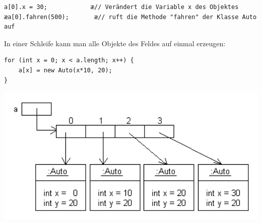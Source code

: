 \begin{lstlisting}
a[0].x = 30;            æ// Verändert die Variable x des Objektes
æa[0].fahren(500);       æ// ruft die Methode "fahren" der Klasse Auto auf
\end{lstlisting}

\pagebreak

In einer Schleife kann man alle Objekte des Feldes auf einmal erzeugen:

\begin{lstlisting}
for (int x = 0; x < a.length; x++) {
    a[x] = new Auto(x*10, 20);
}
\end{lstlisting}

\begin{minipage}{0.6\textwidth}
\includegraphics[width=1.0\textwidth]{./inf/SEKII/18_Java_Arrays/Erzeugung3.png}
\end{minipage}
